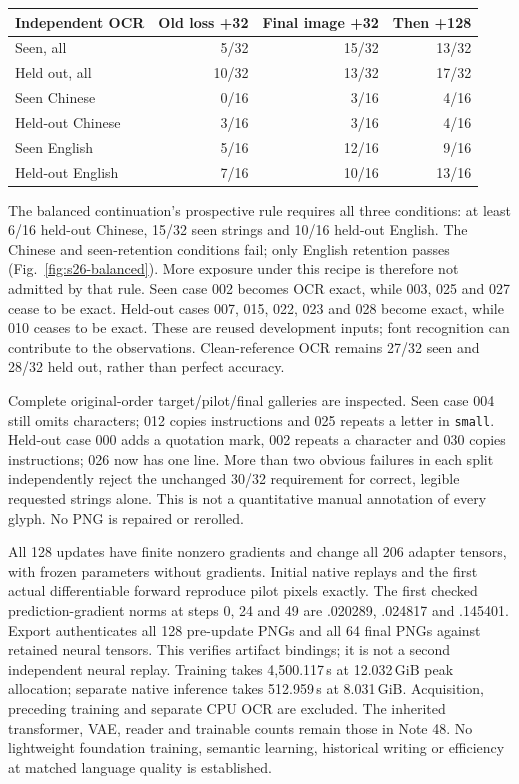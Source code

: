 \begin{center}\small
\begin{tabular}{lrrr}
\toprule
Independent OCR & Old loss +32 & Final image +32 & Then +128\\
\midrule
Seen, all & 5/32 & 15/32 & 13/32\\
Held out, all & 10/32 & 13/32 & 17/32\\
Seen Chinese & 0/16 & 3/16 & 4/16\\
Held-out Chinese & 3/16 & 3/16 & 4/16\\
Seen English & 5/16 & 12/16 & 9/16\\
Held-out English & 7/16 & 10/16 & 13/16\\
\bottomrule
\end{tabular}
\end{center}

The balanced continuation's prospective rule requires all three conditions:
at least 6/16 held-out Chinese, 15/32 seen strings and 10/16 held-out English.
The Chinese and seen-retention conditions fail; only English retention passes
(Fig.~\ref{fig:s26-balanced}). More exposure under this recipe is therefore
not admitted by that rule. Seen case 002 becomes OCR exact, while 003, 025
and 027 cease to be exact. Held-out cases 007, 015, 022, 023 and 028 become
exact, while 010 ceases to be exact. These are reused development inputs;
font recognition can contribute to the observations. Clean-reference OCR
remains 27/32 seen and 28/32 held out, rather than perfect accuracy.

Complete original-order target/pilot/final galleries are inspected. Seen
case 004 still omits characters; 012 copies instructions and 025 repeats a
letter in \texttt{small}. Held-out case 000 adds a quotation mark, 002 repeats
a character and 030 copies instructions; 026 now has one line. More than
two obvious failures in each split independently reject the unchanged 30/32
requirement for correct, legible requested strings alone. This is not a
quantitative manual annotation of every glyph. No PNG is repaired or rerolled.

All 128 updates have finite nonzero gradients and change all 206 adapter
tensors, with frozen parameters without gradients. Initial native replays
and the first actual differentiable forward reproduce pilot pixels exactly.
The first checked prediction-gradient norms at steps 0, 24 and 49 are .020289,
.024817 and .145401. Export authenticates all 128 pre-update PNGs and all
64 final PNGs against retained neural tensors. This verifies artifact bindings;
it is not a second independent neural replay. Training takes 4,500.117\,s at
12.032\,GiB peak allocation; separate native inference takes 512.959\,s at
8.031\,GiB. Acquisition, preceding training and separate CPU OCR are excluded.
The inherited transformer, VAE, reader and trainable counts remain those in
Note 48. No lightweight foundation training, semantic learning, historical
writing or efficiency at matched language quality is established.

